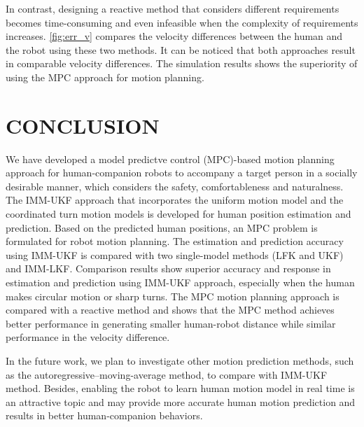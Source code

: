 \documentclass[letterpaper, 10 pt, conference]{ieeeconf}
\begin{document}
In contrast, designing a reactive method that considers different requirements becomes time-consuming and even infeasible when the complexity of requirements increases.
\cref{fig:err_v} compares the velocity differences between the human and the robot using these two methods.
It can be noticed that both approaches result in comparable velocity differences.
The simulation results shows the superiority of using the MPC approach for motion planning.

\section{CONCLUSION}\label{sec:conclusion}
We have developed a model predictve control (MPC)-based motion planning approach for human-companion robots to accompany a target person in a socially desirable manner, which considers the safety, comfortableness and naturalness.
The IMM-UKF approach that incorporates the uniform motion model and the coordinated turn motion models is developed for human position estimation and prediction.
Based on the predicted human positions, an MPC problem is formulated for robot motion planning.
The estimation and prediction accuracy using IMM-UKF is compared with two single-model methods (LFK and UKF) and IMM-LKF.
Comparison results show superior accuracy and response in estimation and prediction using IMM-UKF approach, especially when the human makes circular motion or sharp turns.
The MPC motion planning approach is compared with a reactive method and shows that the MPC method achieves better performance in generating smaller human-robot distance while similar performance in the velocity difference.

In the future work, we plan to investigate other motion prediction methods, such as the autoregressive–moving-average method, to compare with IMM-UKF method.
Besides,  enabling the robot to learn human motion model in real time is an attractive topic and may provide more accurate human motion prediction and results in better human-companion behaviors.
\end{document}

